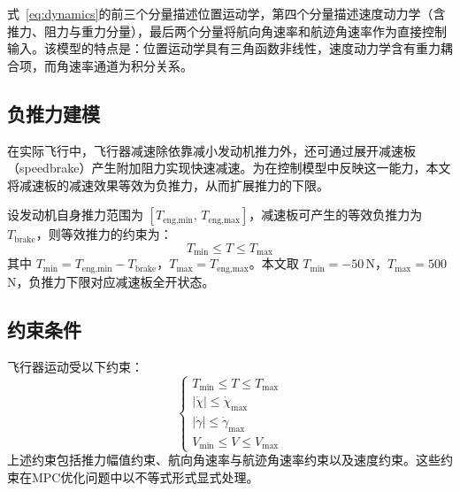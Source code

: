 式~\eqref{eq:dynamics}的前三个分量描述位置运动学，第四个分量描述速度动力学（含推力、阻力与重力分量），最后两个分量将航向角速率和航迹角速率作为直接控制输入。该模型的特点是：位置运动学具有三角函数非线性，速度动力学含有重力耦合项，而角速率通道为积分关系。

\subsection{负推力建模}\label{sec:neg_thrust}

在实际飞行中，飞行器减速除依靠减小发动机推力外，还可通过展开减速板（speedbrake）产生附加阻力实现快速减速。为在控制模型中反映这一能力，本文将减速板的减速效果等效为负推力，从而扩展推力的下限。

设发动机自身推力范围为 $[T_{\text{eng,min}},\, T_{\text{eng,max}}]$，减速板可产生的等效负推力为 $T_{\text{brake}}$，则等效推力的约束为：
\begin{equation}\label{eq:thrust_constraint}
T_{\min} \leq T \leq T_{\max}
\end{equation}
其中 $T_{\min} = T_{\text{eng,min}} - T_{\text{brake}}$，$T_{\max} = T_{\text{eng,max}}$。本文取 $T_{\min} = -50$\,N，$T_{\max} = 500$\,N，负推力下限对应减速板全开状态。

\subsection{约束条件}

飞行器运动受以下约束：
\begin{equation}\label{eq:constraints}
\begin{cases}
T_{\min} \leq T \leq T_{\max} \\[4pt]
|\dot{\chi}| \leq \dot{\chi}_{\max} \\[4pt]
|\dot{\gamma}| \leq \dot{\gamma}_{\max} \\[4pt]
V_{\min} \leq V \leq V_{\max}
\end{cases}
\end{equation}
上述约束包括推力幅值约束、航向角速率与航迹角速率约束以及速度约束。这些约束在MPC优化问题中以不等式形式显式处理。

